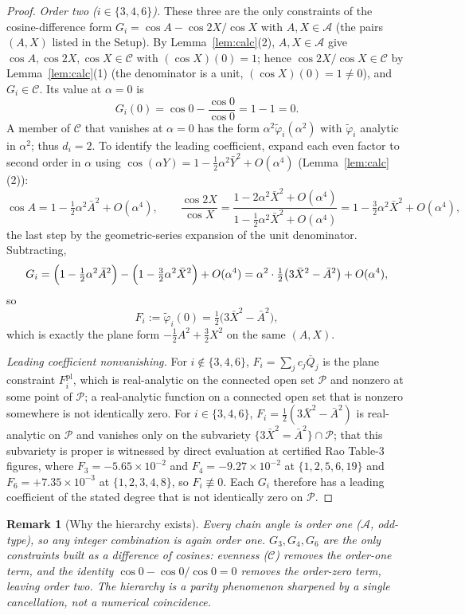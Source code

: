 \documentclass[pdflatex,sn-mathphys-num]{sn-jnl}
\theoremstyle{thmstyleone}%
\theoremstyle{thmstyletwo}%
\newtheorem{remark}{Remark}%
\theoremstyle{thmstylethree}%
\begin{document}
\begin{proof}
\emph{Order two ($i\in\{3,4,6\}$).}
These three are the only constraints of the cosine-difference form
$G_i=\cos A-\cos 2X/\cos X$ with $A,X\in\mathcal A$ (the pairs $(A,X)$ listed in the Setup).
By Lemma~\ref{lem:calc}(2), $A,X\in\mathcal A$ give $\cos A,\cos 2X,\cos X\in\mathcal C$ with $(\cos X)(0)=1$; hence $\cos 2X/\cos X\in\mathcal C$ by Lemma~\ref{lem:calc}(1) (the denominator is a unit, $(\cos X)(0)=1\neq0$), and $G_i\in\mathcal C$. Its value at $\alpha=0$ is
\[
  G_i(0)=\cos 0-\frac{\cos 0}{\cos 0}=1-1=0 .
\]
A member of $\mathcal C$ that vanishes at $\alpha=0$ has the form $\alpha^2\tilde\varphi_i(\alpha^2)$ with $\tilde\varphi_i$ analytic in $\alpha^2$; thus $d_i=2$. To identify the leading coefficient, expand each even factor to second order in $\alpha$ using $\cos(\alpha Y)=1-\tfrac12\alpha^2\bar Y^2+O(\alpha^4)$ (Lemma~\ref{lem:calc}(2)):
\[
  \cos A=1-\tfrac12\alpha^2\bar A^2+O(\alpha^4),\qquad
  \frac{\cos 2X}{\cos X}
   =\frac{1-2\alpha^2\bar X^2+O(\alpha^4)}{1-\tfrac12\alpha^2\bar X^2+O(\alpha^4)}
   =1-\tfrac32\alpha^2\bar X^2+O(\alpha^4),
\]
the last step by the geometric-series expansion of the unit denominator. Subtracting,
\[
  G_i=\Bigl(1-\tfrac12\alpha^2\bar A^2\Bigr)-\Bigl(1-\tfrac32\alpha^2\bar X^2\Bigr)+O(\alpha^4)
     =\alpha^2\cdot\tfrac12\bigl(3\bar X^2-\bar A^2\bigr)+O(\alpha^4),
\]
so
\[
  F_i:=\tilde\varphi_i(0)=\tfrac12\bigl(3\bar X^2-\bar A^2\bigr),
\]
which is exactly the plane form $-\tfrac12 A^2+\tfrac32 X^2$ on the same $(A,X)$.

\emph{Leading coefficient nonvanishing.}
For $i\notin\{3,4,6\}$, $F_i=\sum_j c_j\bar Q_j$ is the plane constraint
$F_i^{\mathrm{pl}}$, which is real-analytic on the connected open set $\mathcal P$ and nonzero at some point of $\mathcal P$; a real-analytic function on a connected open set that is nonzero somewhere is not identically zero. For $i\in\{3,4,6\}$, $F_i=\tfrac12(3\bar X^2-\bar A^2)$ is real-analytic on $\mathcal P$ and vanishes only on the subvariety $\{3\bar X^2=\bar A^2\}\cap\mathcal P$; that this subvariety is proper is witnessed by direct evaluation at certified Rao Table-3 figures, where $F_3=-5.65\times10^{-2}$ and $F_4=-9.27\times10^{-2}$ at $\{1,2,5,6,19\}$ and $F_6=+7.35\times10^{-3}$ at $\{1,2,3,4,8\}$, so $F_i\not\equiv0$. Each $G_i$ therefore has a leading coefficient of the stated degree that is not identically zero on $\mathcal P$.
\end{proof}

\begin{remark}[Why the hierarchy exists]
Every chain angle is order one ($\mathcal A$, odd-type), so any integer combination is again order one. $G_3,G_4,G_6$ are the only constraints built as a difference of \emph{cosines}: evenness ($\mathcal C$) removes the order-one term, and the identity $\cos0-\cos0/\cos0=0$ removes the order-zero term, leaving order two. The hierarchy is a parity phenomenon sharpened by a single cancellation, not a numerical coincidence.
\end{remark}
\end{document}
